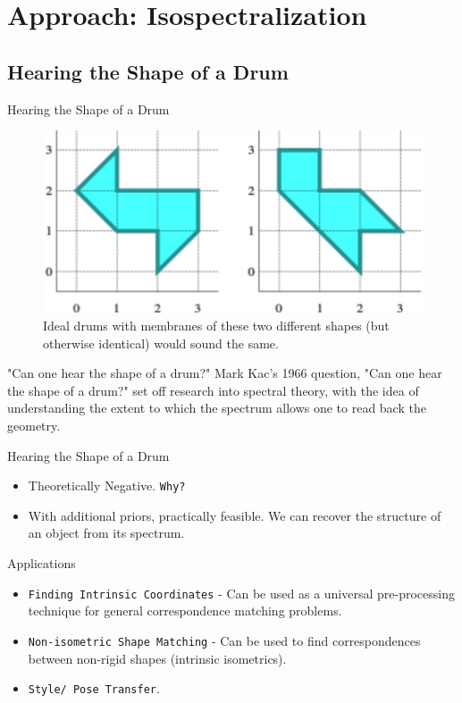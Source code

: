 \documentclass{beamer}
\begin{document}
\section{Approach: Isospectralization}

\subsection{Hearing the Shape of a Drum}

\begin{frame}{Hearing the Shape of a Drum}

\begin{figure}
    \centering
    \includegraphics[height=0.2\textwidth]{Indenticalshapes.png}
    \caption{Ideal drums with membranes of these two different shapes (but otherwise identical) would sound the same.}
    \label{fig:Identicalshapes}
\end{figure}

\begin{block} {"Can one hear the shape of a drum?"}
    Mark Kac's 1966 question, "Can one hear the shape of a drum?" set off research into spectral theory, with the idea of understanding the extent to which the spectrum allows one to read back the geometry. 
\end{block}


\end{frame}

\begin{frame}{Hearing the Shape of a Drum}

\begin{itemize}
    \item Theoretically Negative. \texttt{Why?}
    \item With additional priors, practically feasible. We can recover the structure of an object from its spectrum.
    
\end{itemize}
    
\end{frame}

\begin{frame}{Applications}

\begin{itemize}
    \item \texttt{Finding Intrinsic Coordinates} - Can be used as a universal pre-processing technique for general correspondence matching problems.
    \item  \texttt{Non-isometric Shape Matching} - Can be used to find correspondences between non-rigid shapes (intrinsic isometrics).
    \item  \texttt{Style/ Pose Transfer}.
    
\end{itemize}
    
\end{frame}
\end{document}
